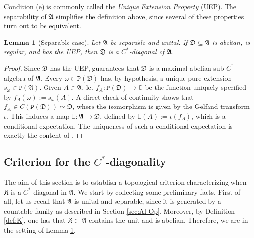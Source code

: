 \documentclass[a4paper,12pt,twoside,reqno]{amsart}
\theoremstyle{plain}
\newtheorem{lemma}[teo]{Lemma}
\theoremstyle{definition}
\theoremstyle{remark}
\numberwithin{equation}{section}
\numberwithin{figure}{section}
\numberwithin{table}{section}
\newcommand{\n}[1]{\mathbb{#1}}
\begin{document}
	\medskip
	
	Condition (e) is commonly called the \emph{Unique Extension Property} (UEP). The separability of $\mathfrak{A}$ simplifies the definition above, since several of these properties turn out to be equivalent.
	
	
	\begin{lemma}[Separable case]\label{lemm:Sep}
		Let $\mathfrak{A}$ be separable and unital. If $\mathfrak{D}\subseteq \mathfrak{A}$ is abelian, is regular, and has the UEP, then $\mathfrak{D}$ is a $C^*$-diagonal of $\mathfrak{A}$.
	\end{lemma}
	\begin{proof}
		Since $\mathfrak{D}$ has the UEP, \cite[Corollary 2.7]{Archbold} guarantees that $\mathfrak{D}$ is a maximal abelian sub-$C^*$-algebra of $\mathfrak{A}$.
		Every $\omega\in\mathtt{P}(\mathfrak{D})$ has, by hypothesis, a unique pure extension $s_\omega\in \mathtt{P}(\mathfrak{A})$. Given $A\in\mathfrak{A}$, let $f_A:\mathtt{P}(\mathfrak{D})\to\n{C}$ be the function uniquely specified by $f_A(\omega):=s_\omega(A)$. A direct check of continuity shows that $f_A\in C(\mathtt{P}(\mathfrak{D}))\simeq \mathfrak{D}$, where the isomorphism is given by the Gelfand transform $\iota$. This induces a map $\n{E}:\mathfrak{A}\to\mathfrak{D}$, defined by $\n{E}(A):=\iota(f_A)$, which is a conditional expectation. The uniqueness of such a conditional expectation is exactly the content of \cite[Theorem 3.4]{Anderson}.
	\end{proof}
	
	
	
	\subsection{Criterion for the $C^*$-diagonality}
	The aim of this section is to establish a topological criterion characterizing when $\mathfrak{K}$ is a $C^*$-diagonal in $\mathfrak{A}$. We start by collecting some preliminary facts.
	First of all, let us recall that $\mathfrak{A}$ is unital and separable, since it is generated by a countable family as described in Section \ref{sec:Al-Op}. Moreover, by Definition \ref{def:K}, one has that $\mathfrak{K}\subset\mathfrak{A}$ contains the unit and is abelian. Therefore, we are in the setting of Lemma \ref{lemm:Sep}.
	
\end{document}
